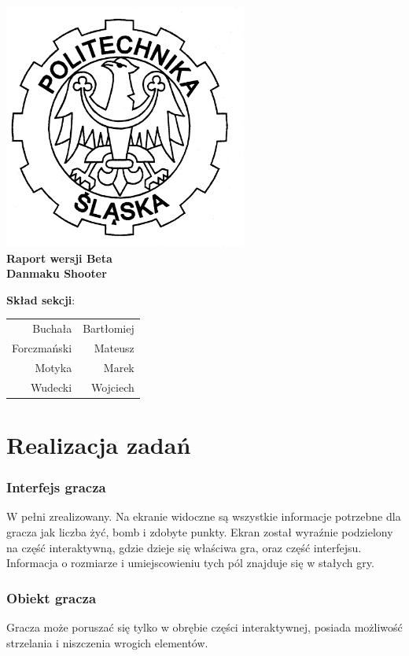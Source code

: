 \documentclass[a4paper,twoside]{article}
\begin{document}
\begin{titlepage}
		\centering
		\includegraphics[width=0.6\textwidth]{./images/logo.png}
		\\\vspace{10mm}
		\textbf{{\huge Raport wersji Beta}}\\\vspace{5mm}
		\textbf{{\Huge Danmaku Shooter}}
		\\
		\vfill
		\begin{flushright}
			{\Large \textbf{Skład sekcji}:}\\
			\begin{tabular}{rr}
				{\Large Buchała} & {\Large Bartłomiej}\\[-3pt]
				{\Large Forczmański} & {\Large Mateusz}\\[-3pt]
				{\Large Motyka} & {\Large Marek}\\[-3pt]
				{\Large Wudecki} & {\Large Wojciech}
			\end{tabular}
		\end{flushright}
	\end{titlepage}
	
	\newpage
	\part{Realizacja zadań}
		\section{Interfejs gracza}
			W pełni zrealizowany. Na ekranie widoczne są wszystkie informacje potrzebne dla gracza jak liczba żyć, bomb i zdobyte punkty. Ekran został wyraźnie podzielony na część interaktywną, gdzie dzieje się właściwa gra, oraz część interfejsu. Informacja o rozmiarze i umiejscowieniu tych pól znajduje się w stałych gry.
		\section{Obiekt gracza}
			Gracza może poruszać się tylko w obrębie części interaktywnej, posiada możliwość strzelania i niszczenia wrogich elementów.
\end{document}
